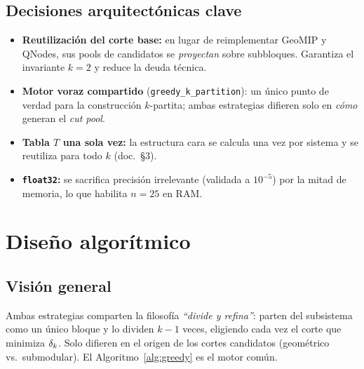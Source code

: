 \documentclass[11pt,letterpaper]{article}
\begin{document}
\subsection{Decisiones arquitectónicas clave}
\begin{itemize}
	\item \textbf{Reutilización del corte base:} en lugar de reimplementar GeoMIP y
	      QNodes, sus pools de candidatos se \emph{proyectan} sobre subbloques. Garantiza
	      el invariante $k=2$ y reduce la deuda técnica.
	\item \textbf{Motor voraz compartido} (\texttt{greedy\_k\_partition}): un único
	      punto de verdad para la construcción $k$-partita; ambas estrategias difieren
	      solo en \emph{cómo} generan el \emph{cut pool}.
	\item \textbf{Tabla $T$ una sola vez:} la estructura cara se calcula una vez por
	      sistema y se reutiliza para todo $k$ (doc.\ §3).
	\item \textbf{\texttt{float32}:} se sacrifica precisión irrelevante (validada a
	      $10^{-5}$) por la mitad de memoria, lo que habilita $n=25$ en RAM.
\end{itemize}

\section{Diseño algorítmico}

\subsection{Visión general}
Ambas estrategias comparten la filosofía \emph{``divide y refina''}: parten del
subsistema como un único bloque y lo dividen $k-1$ veces, eligiendo cada vez el
corte que minimiza $\delta_k$. Solo difieren en el origen de los cortes candidatos
(geométrico vs.\ submodular). El Algoritmo~\ref{alg:greedy} es el motor común.
\end{document}
